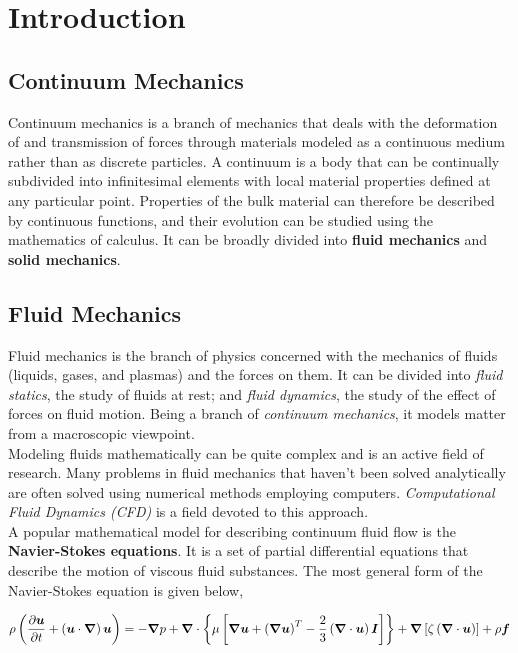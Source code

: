 \newpage
\chapter{Introduction}

\section{Continuum Mechanics}

Continuum mechanics is a branch of mechanics that deals with the deformation of and transmission of forces through materials modeled as a continuous medium rather than as discrete particles. A continuum is a body that can be continually subdivided into infinitesimal elements with local material properties defined at any particular point. Properties of the bulk material can therefore be described by continuous functions, and their evolution can be studied using the mathematics of calculus. It can be broadly divided into \textbf{fluid mechanics} and \textbf{solid mechanics}.

\section{Fluid Mechanics}

Fluid mechanics is the branch of physics concerned with the mechanics of fluids (liquids, gases, and plasmas) and the forces on them. It can be divided into \textit{fluid statics}, the study of fluids at rest; and \textit{fluid dynamics}, the study of the effect of forces on fluid motion. Being a branch of \textit{continuum mechanics}, it models matter from a macroscopic viewpoint. \\

\noindent Modeling fluids mathematically can be quite complex and is an active field of research. Many problems in fluid mechanics that haven't been solved analytically are often solved using numerical methods employing computers. \textit{Computational Fluid Dynamics (CFD)} is a field devoted to this approach. \\

\noindent A popular mathematical model for describing continuum fluid flow is the \textbf{Navier-Stokes equations}. It is a set of partial differential equations that describe the motion of viscous fluid substances. The most general form of the Navier-Stokes equation is given below,

\begin{equation}
\rho \left( \frac{\partial \vec{u}}{\partial t} + \left( \vec{u}  \cdot \grad \right) \vec{u} \right) = - \grad p + \grad \cdot \left\{ \mu \left[ \grad \vec{u}  + \left( \grad \vec{u} \right) ^ T - \frac{2}{3} \left (\div{u} \right) \vec{I} \right] \right\} + \vec{\nabla} \left[ \zeta \left( \div{u} \right) \right] + \rho \vec{f}
\end{equation}

